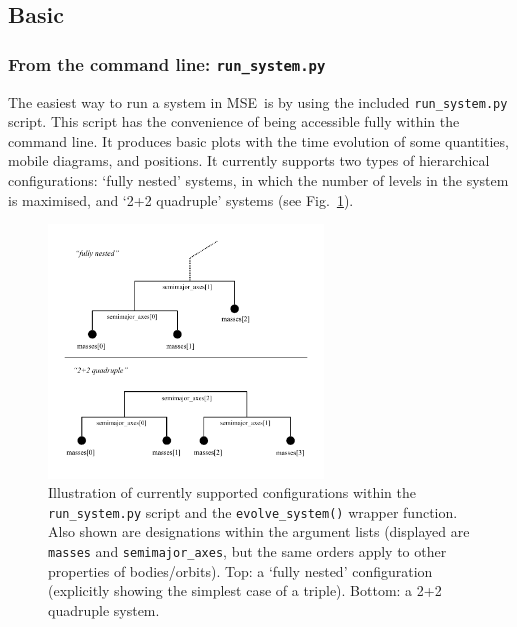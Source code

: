 \documentclass[a4paper,11pt]{article}
\newcommand{\mse}{\textsc{MSE}}
\newcommand{\F}{Fig.}
\begin{document}
\subsection{Basic}%
\label{sect:usepy:basic}
\subsubsection{From the command line: \texttt{run\_system.py}}
\label{sect:usepy:basic:run}
The easiest way to run a system in \mse~is by using the included \texttt{run\_system.py} script. This script has the convenience of being accessible fully within the command line. It produces basic plots with the time evolution of some quantities, mobile diagrams, and positions. It currently supports two types of hierarchical configurations: `fully nested' systems, in which the number of levels in the system is maximised, and `2+2 quadruple' systems (see \F~\ref{fig:wrapper}).

\begin{figure}
  \center
  \includegraphics[width=0.65\textwidth,trim=0mm 0mm 0mm 0mm]{figs/wrapper}
  \caption{Illustration of currently supported configurations within the \texttt{run\_system.py} script and the \texttt{evolve\_system()} wrapper function. Also shown are designations within the argument lists (displayed are \texttt{masses} and \texttt{semimajor\_axes}, but the same orders apply to other properties of bodies/orbits). Top: a `fully nested' configuration (explicitly showing the simplest case of a triple). Bottom: a 2+2 quadruple system. }
\label{fig:wrapper}
\end{figure}
\end{document}

